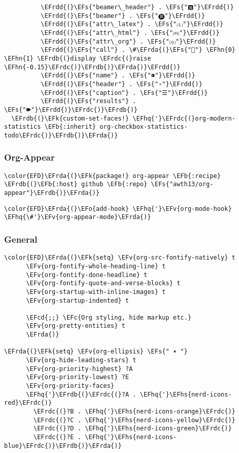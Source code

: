 \documentclass[12pt]{article}
\theoremstyle{plain}%
\theoremstyle{definition}
\theoremstyle{remark}
\newcommand{\EFc}[1]{\textcolor{EFc}{#1}} %
\newcommand{\EFcd}[1]{\textcolor{EFcd}{#1}} %
\newcommand{\EFs}[1]{\textcolor{EFs}{#1}} %
\newcommand{\EFk}[1]{\textcolor{EFk}{#1}} %
\newcommand{\EFb}[1]{\textcolor{EFb}{#1}} %
\newcommand{\EFv}[1]{\textcolor{EFv}{#1}} %
\newcommand{\EFo}[1]{\textcolor{EFo}{#1}} %
\newcommand{\EFhn}[1]{\textcolor{EFhn}{\textbf{#1}}} %
\newcommand{\EFhq}[1]{\textcolor{EFhq}{#1}} %
\newcommand{\EFhs}[1]{\textcolor{EFhs}{#1}} %
\newcommand{\EFrda}[1]{\textcolor{EFrda}{#1}} %
\newcommand{\EFrdb}[1]{\textcolor{EFrdb}{#1}} %
\newcommand{\EFrdc}[1]{\textcolor{EFrdc}{#1}} %
\newcommand{\EFrdd}[1]{\textcolor{EFrdd}{#1}} %
\begin{document}
\begin{Code}
\begin{Verbatim}
          \EFrdd{(}\EFs{"beamer\_header"} . \EFs{"🅱"}\EFrdd{)}
          \EFrdd{(}\EFs{"beamer"} . \EFs{"🅑"}\EFrdd{)}
          \EFrdd{(}\EFs{"attr\_latex"} . \EFs{"🄛"}\EFrdd{)}
          \EFrdd{(}\EFs{"attr\_html"} . \EFs{"🄗"}\EFrdd{)}
          \EFrdd{(}\EFs{"attr\_org"} . \EFs{"⒪"}\EFrdd{)}
          \EFrdd{(}\EFs{"call"} . \#\EFrda{(}\EFs{""} \EFhn{0} \EFhn{1} \EFrdb{(}display \EFrdc{(}raise \EFhn{-0.15}\EFrdc{)}\EFrdb{)}\EFrda{)}\EFrdd{)}
          \EFrdd{(}\EFs{"name"} . \EFs{"⁍"}\EFrdd{)}
          \EFrdd{(}\EFs{"header"} . \EFs{"›"}\EFrdd{)}
          \EFrdd{(}\EFs{"caption"} . \EFs{"☰"}\EFrdd{)}
          \EFrdd{(}\EFs{"results"} . \EFs{"🠶"}\EFrdd{)}\EFrdc{)}\EFrdb{)}
  \EFrdb{(}\EFk{custom-set-faces!} \EFhq{'}\EFrdc{(}org-modern-statistics \EFb{:inherit} org-checkbox-statistics-todo\EFrdc{)}\EFrdb{)}\EFrda{)}
\end{Verbatim}
\end{Code}
\subsubsection{Org-Appear}
\label{sec:org9687eb4}
\begin{Code}
\begin{Verbatim}
\color{EFD}\EFrda{(}\EFk{package!} org-appear \EFb{:recipe} \EFrdb{(}\EFb{:host} github \EFb{:repo} \EFs{"awth13/org-appear"}\EFrdb{)}\EFrda{)}
\end{Verbatim}
\end{Code}
\begin{Code}
\begin{Verbatim}
\color{EFD}\EFrda{(}\EFo{add-hook} \EFhq{'}\EFv{org-mode-hook} \EFhq{\#'}\EFv{org-appear-mode}\EFrda{)}
\end{Verbatim}
\end{Code}
\subsubsection{General}
\label{sec:org7c42582}
\begin{Code}
\begin{Verbatim}
\color{EFD}\EFrda{(}\EFk{setq} \EFv{org-src-fontify-natively} t
      \EFv{org-fontify-whole-heading-line} t
      \EFv{org-fontify-done-headline} t
      \EFv{org-fontify-quote-and-verse-blocks} t
      \EFv{org-startup-with-inline-images} t
      \EFv{org-startup-indented} t

      \EFcd{;;} \EFc{Org styling, hide markup etc.}
      \EFv{org-pretty-entities} t
      \EFrda{)}

\EFrda{(}\EFk{setq} \EFv{org-ellipsis} \EFs{" ▾ "}
      \EFv{org-hide-leading-stars} t
      \EFv{org-priority-highest} ?A
      \EFv{org-priority-lowest} ?E
      \EFv{org-priority-faces}
      \EFhq{'}\EFrdb{(}\EFrdc{(}?A . \EFhq{'}\EFhs{nerd-icons-red}\EFrdc{)}
        \EFrdc{(}?B . \EFhq{'}\EFhs{nerd-icons-orange}\EFrdc{)}
        \EFrdc{(}?C . \EFhq{'}\EFhs{nerd-icons-yellow}\EFrdc{)}
        \EFrdc{(}?D . \EFhq{'}\EFhs{nerd-icons-green}\EFrdc{)}
        \EFrdc{(}?E . \EFhq{'}\EFhs{nerd-icons-blue}\EFrdc{)}\EFrdb{)}\EFrda{)}
\end{Verbatim}
\end{Code}
\end{document}
